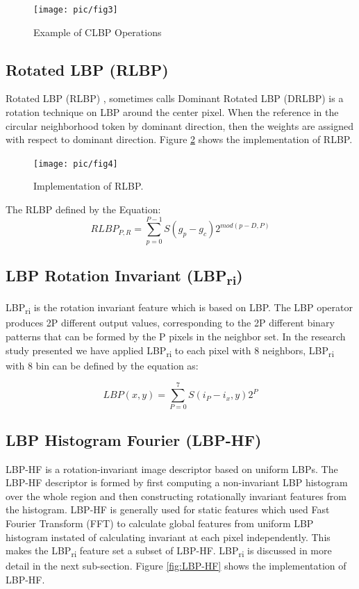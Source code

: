 \documentclass[review]{elsarticle}
\begin{document}
\begin{figure}[h!]
	\centering
	\texttt{[image: pic/fig3]}
	\caption{Example of CLBP Operations}
	\label{fig:CLBP}
\end{figure}

\subsection{Rotated LBP (RLBP)}
\label{subsec:RLBP}
Rotated LBP (RLBP) \cite{Mehta2013}, sometimes calls Dominant Rotated LBP (DRLBP) \cite{Mehta2016} is a rotation technique on LBP around the center pixel. When the reference in the circular neighborhood token by dominant direction, then the weights are assigned with respect to dominant direction. Figure \ref{fig:RLBP} shows the implementation of RLBP. 

\begin{figure}[h!]
	\centering
	\texttt{[image: pic/fig4]}
	\caption{Implementation of RLBP.}
	\label{fig:RLBP}
\end{figure}
The RLBP defined by the Equation:\\
\begin{equation}
RLBP_{P,R} = \sum_{p=0}^{P-1} S(g_p - g_c)2^{mod(p-D,P)}
\end{equation}

\subsection{LBP Rotation Invariant (LBP\textsubscript{ri})}
\label{subsec:LBPri}
LBP\textsubscript{ri} is the rotation invariant feature which is based on LBP. The LBP operator produces 2P different output values, corresponding to the 2P different binary patterns that can be formed by the P pixels in the neighbor set. In the research study presented we have applied LBP\textsubscript{ri} to each pixel with 8 neighbors, LBP\textsubscript{ri} with 8 bin can be defined by the equation as:

\begin{equation}
LBP(x,y) = \sum_{P=0}^{7} S(i_P - i_x,y)2^P
\end{equation}

\subsection{LBP Histogram Fourier (LBP-HF)}
\label{subsec:LBP-hf}
LBP-HF is a rotation-invariant image descriptor based on uniform LBPs. The LBP-HF descriptor is formed by first computing a non-invariant LBP histogram over the whole region and then constructing rotationally invariant features from the histogram. LBP-HF is generally used for static features which used Fast Fourier Transform (FFT) to calculate global features from uniform LBP histogram instated of calculating invariant at each pixel independently. This makes the LBP\textsubscript{ri} feature set a subset of LBP-HF. LBP\textsubscript{ri} is discussed in more detail in the next sub-section. Figure \ref{fig:LBP-HF} shows the implementation of LBP-HF. 
\end{document}
